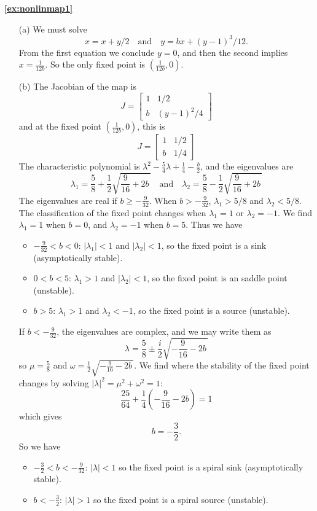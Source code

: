 \newpage

\textbf{\ref{ex:nonlinmap1}}
\begin{enumerate}
\item[(a)]
We must solve
\[
   x = x + y/2 \quad\textrm{and}\quad y = bx + (y-1)^3/12.
\]
From the first equation we conclude $y=0$,
and then the second implies $x = \frac{1}{12b}$.
So the only fixed point is $\left(\frac{1}{12b},0\right)$.
\item[(b)]
The Jacobian of the map is
\[
  J = \begin{bmatrix}
            1  & 1/2 \\
	    b  & (y-1)^2/4
      \end{bmatrix}
\]
and at the fixed point $\left(\frac{1}{12b},0\right)$, this is
\[
  J = \begin{bmatrix}
           1 & 1/2 \\
	   b & 1/4
      \end{bmatrix}
\]
The characteristic polynomial is
 $\lambda^2 - \frac{5}{4}\lambda + \frac{1}{4}-\frac{b}{2}$,
and the eigenvalues are
\[
   \lambda_1 = \frac{5}{8} + \frac{1}{2}\sqrt{\frac{9}{16} + 2b\,}
   \quad\textrm{and}\quad
   \lambda_2 = \frac{5}{8} - \frac{1}{2}\sqrt{\frac{9}{16} + 2b\,}
\]
The eigenvalues are real if $b \ge -\frac{9}{32}$.
When $b > -\frac{9}{32}$, $\lambda_1 > 5/8$ and $\lambda_2 < 5/8$.
The classification of the fixed point changes when $\lambda_1 = 1$
or $\lambda_2 = -1$.  We find $\lambda_1 = 1$ when $b=0$, and
$\lambda_2 = -1$ when $b = 5$.  Thus we have
\begin{itemize}
\item $-\frac{9}{32} < b < 0$:   $|\lambda_1| < 1$ and $|\lambda_2| < 1$, so the fixed point is a sink (asymptotically stable).
\item $0 < b < 5$: $\lambda_1 > 1$ and $|\lambda_2| < 1$, so the fixed point is an saddle point (unstable).
\item $b > 5$: $\lambda_1 > 1$ and $\lambda_2 < -1$, so the fixed point is a source (unstable).
\end{itemize}
If $b < -\frac{9}{32}$, the eigenvalues are complex,
and we may write them as
\[
   \lambda = \frac{5}{8} \pm \frac{i}{2}\sqrt{-\frac{9}{16} - 2b\,}
\]
so $\mu = \frac{5}{8}$ and $\omega = \frac{1}{2}\sqrt{-\frac{9}{16} - 2b\,}$.
We find where the stability of the fixed point changes by solving
$|\lambda|^2 = \mu^2+\omega^2 = 1$:
\[
   \frac{25}{64} + \frac{1}{4}\left(-\frac{9}{16} - 2b\right) = 1
\]
which gives
\[
   b = -\frac{3}{2}.
\]
So we have
\begin{itemize}
\item $-\frac{3}{2} < b < -\frac{9}{32}$: $|\lambda| < 1$ so the fixed point is a spiral sink (asymptotically stable).
\item $ b < -\frac{3}{2}$: $|\lambda|>1$ so the fixed point is a spiral source (unstable).
\end{itemize}
\end{enumerate}